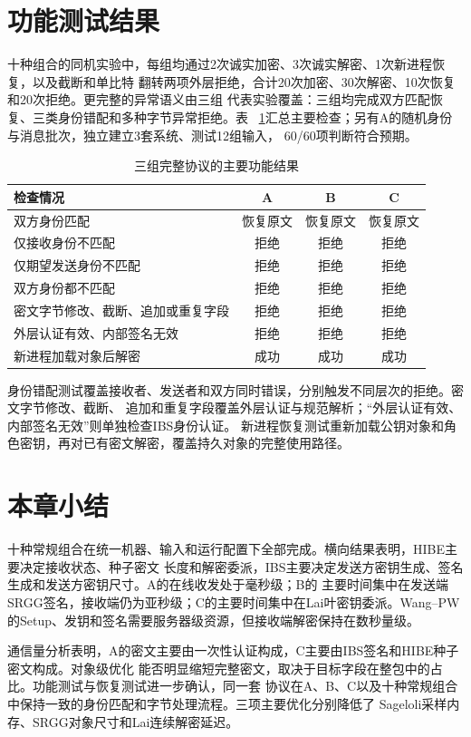 \section{功能测试结果}
十种组合的同机实验中，每组均通过2次诚实加密、3次诚实解密、1次新进程恢复，以及截断和单比特
翻转两项外层拒绝，合计20次加密、30次解密、10次恢复和20次拒绝。更完整的异常语义由三组
代表实验覆盖：三组均完成双方匹配恢复、三类身份错配和多种字节异常拒绝。表
~\ref{tab:functional}汇总主要检查；另有A的随机身份与消息批次，独立建立3套系统、测试12组输入，
60/60项判断符合预期。

\begin{table}[H]
\centering\small
\caption{三组完整协议的主要功能结果}
\label{tab:functional}
\begin{tabularx}{\textwidth}{@{}Xccc@{}}
\toprule
\rowcolor{black!8} 检查情况 & A & B & C \\
\midrule
双方身份匹配 & 恢复原文 & 恢复原文 & 恢复原文 \\
仅接收身份不匹配 & 拒绝 & 拒绝 & 拒绝 \\
仅期望发送身份不匹配 & 拒绝 & 拒绝 & 拒绝 \\
双方身份都不匹配 & 拒绝 & 拒绝 & 拒绝 \\
密文字节修改、截断、追加或重复字段 & 拒绝 & 拒绝 & 拒绝 \\
外层认证有效、内部签名无效 & 拒绝 & 拒绝 & 拒绝 \\
新进程加载对象后解密 & 成功 & 成功 & 成功 \\
\bottomrule
\end{tabularx}
\end{table}

身份错配测试覆盖接收者、发送者和双方同时错误，分别触发不同层次的拒绝。密文字节修改、截断、
追加和重复字段覆盖外层认证与规范解析；“外层认证有效、内部签名无效”则单独检查IBS身份认证。
新进程恢复测试重新加载公钥对象和角色密钥，再对已有密文解密，覆盖持久对象的完整使用路径。

\section{本章小结}

十种常规组合在统一机器、输入和运行配置下全部完成。横向结果表明，HIBE主要决定接收状态、种子密文
长度和解密委派，IBS主要决定发送方密钥生成、签名生成和发送方密钥尺寸。A的在线收发处于毫秒级；B的
主要时间集中在发送端SRGG签名，接收端仍为亚秒级；C的主要时间集中在Lai叶密钥委派。Wang--PW
的Setup、发钥和签名需要服务器级资源，但接收端解密保持在数秒量级。

通信量分析表明，A的密文主要由一次性认证构成，C主要由IBS签名和HIBE种子密文构成。对象级优化
能否明显缩短完整密文，取决于目标字段在整包中的占比。功能测试与恢复测试进一步确认，同一套
协议在A、B、C以及十种常规组合中保持一致的身份匹配和字节处理流程。三项主要优化分别降低了
Sageloli采样内存、SRGG对象尺寸和Lai连续解密延迟。
